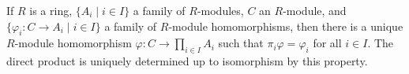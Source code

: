 If $R$ is a ring, $\{A_i \mid i \in I\}$ a family of $R$-modules, $C$ an $R$-module, and $\{\varphi_i : C \to A_i \mid i \in I\}$ a family of $R$-module homomorphisms, then there is a unique $R$-module homomorphism $\varphi : C \to \prod_{i \in I} A_i$ such that $\pi_i \varphi = \varphi_i$ for all $i \in I$. The direct product is uniquely determined up to isomorphism by this property.
